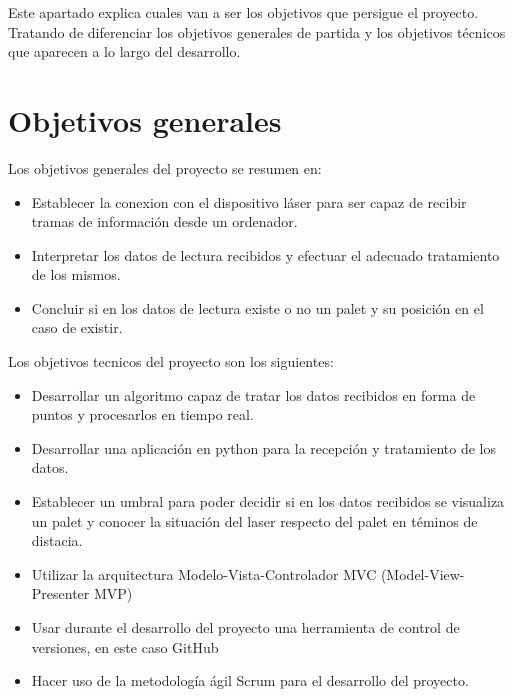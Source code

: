 
Este apartado explica cuales van a ser los objetivos que persigue el proyecto. Tratando de diferenciar los objetivos generales de partida y los objetivos técnicos que aparecen a lo largo del desarrollo.

\section{Objetivos generales}
Los objetivos generales del proyecto se resumen en:
\begin{itemize}
	\item Establecer la conexion con el dispositivo láser para ser capaz de recibir tramas de información desde un ordenador.
	\item Interpretar los datos de lectura recibidos y efectuar el adecuado tratamiento de los mismos.
	\item Concluir si en los datos de lectura existe o no un palet y su posición en el caso de existir.
\end{itemize}

Los objetivos tecnicos del proyecto son los siguientes:
\begin{itemize}
	\item Desarrollar un algoritmo capaz de tratar los datos recibidos en forma de puntos y procesarlos en tiempo real.
	\item Desarrollar una aplicación en python para la recepción y tratamiento de los datos.
	\item Establecer un umbral para poder decidir si en los datos recibidos se visualiza un palet y conocer la situación del laser respecto del palet en téminos de distacia.
	\item Utilizar la arquitectura Modelo-Vista-Controlador MVC (Model-View-Presenter MVP)
	\item Usar durante el desarrollo del proyecto una herramienta de control de versiones, en este caso GitHub
	\item Hacer uso de la metodología ágil Scrum para el desarrollo del proyecto.
\end{itemize}
